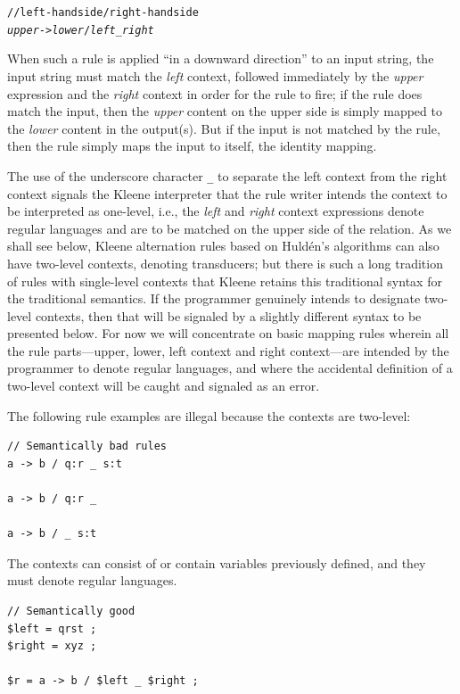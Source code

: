 \begin{alltt}
// left-hand side / right-hand side
\emph{upper} -> \emph{lower} / \emph{left} _ \emph{right}
\end{alltt}

\noindent
When such a rule is applied ``in a downward direction'' to an input string, the input string must match the \emph{left}
context, followed immediately by the \emph{upper} expression and the \emph{right} context in order for the rule to fire; if the rule does match the input, then the
\emph{upper} content on the upper side is simply mapped to the
\emph{lower} content in the output(s).  But if the
input is not matched by the rule, then the rule simply maps the input to itself, the identity mapping.


The use of the underscore character \texttt{\_} to separate the left context from the right context signals the
Kleene interpreter that the rule writer intends the context to be
interpreted as one-level, i.e., the
\emph{left} and \emph{right} context expressions denote regular languages and are to be matched on the upper
side of the relation.  As we shall see below, Kleene alternation rules based on Huldén's algorithms can
also have two-level contexts, denoting transducers; but there is such a long tradition of rules with
single-level contexts that Kleene retains this traditional syntax for the traditional semantics.  If
the programmer genuinely intends to designate two-level contexts, then that will be signaled by a
slightly different syntax to be presented below.  For now we will concentrate on basic mapping rules
wherein all the rule parts---upper, lower, left context and right context---are intended
by the programmer
to denote regular languages, and where the accidental definition of a
two-level context will be caught
and signaled as an error.

The following rule examples are illegal because the contexts are two-level:

\begin{Verbatim}
// Semantically bad rules
a -> b / q:r _ s:t

a -> b / q:r _

a -> b / _ s:t
\end{Verbatim}

\noindent
The contexts can consist of or contain variables previously defined, and they must denote regular languages.


\begin{Verbatim}
// Semantically good
$left = qrst ;
$right = xyz ;

$r = a -> b / $left _ $right ;
\end{Verbatim}

